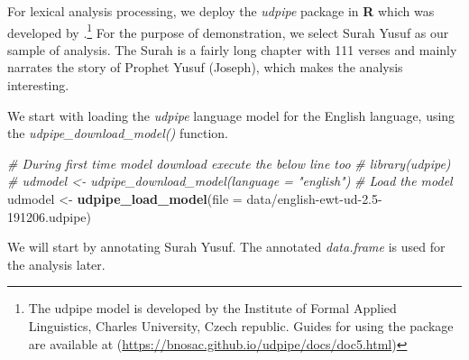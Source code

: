 \documentclass[
]{article}
\newenvironment{Shaded}{\begin{snugshade}}{\end{snugshade}}
\newcommand{\AttributeTok}[1]{\textcolor[rgb]{0.13,0.29,0.53}{#1}}
\newcommand{\CommentTok}[1]{\textcolor[rgb]{0.56,0.35,0.01}{\textit{#1}}}
\newcommand{\DecValTok}[1]{\textcolor[rgb]{0.00,0.00,0.81}{#1}}
\newcommand{\FunctionTok}[1]{\textcolor[rgb]{0.13,0.29,0.53}{\textbf{#1}}}
\newcommand{\NormalTok}[1]{#1}
\newcommand{\OtherTok}[1]{\textcolor[rgb]{0.56,0.35,0.01}{#1}}
\newcommand{\SpecialCharTok}[1]{\textcolor[rgb]{0.81,0.36,0.00}{\textbf{#1}}}
\newcommand{\StringTok}[1]{\textcolor[rgb]{0.31,0.60,0.02}{#1}}
\begin{document}
For lexical analysis processing, we deploy the \emph{udpipe} package in \textbf{R} which was developed by \citet{udpipe}.\footnote{The udpipe model is developed by the Institute of Formal Applied Linguistics, Charles University, Czech republic. Guides for using the package are available at (\url{https://bnosac.github.io/udpipe/docs/doc5.html})} For the purpose of demonstration, we select Surah Yusuf as our sample of analysis. The Surah is a fairly long chapter with 111 verses and mainly narrates the story of Prophet Yusuf (Joseph), which makes the analysis interesting.

We start with loading the \emph{udpipe} language model for the English language, using the \emph{udpipe\_download\_model()} function.

\footnotesize

\begin{Shaded}
\begin{Highlighting}[]
\CommentTok{\# During first time model download execute the below line too}
\CommentTok{\# library(udpipe)}
\CommentTok{\# udmodel \textless{}{-} udpipe\_download\_model(language = "english")}
\CommentTok{\# Load the model}
\NormalTok{udmodel }\OtherTok{\textless{}{-}} \FunctionTok{udpipe\_load\_model}\NormalTok{(}\AttributeTok{file =} \StringTok{\textquotesingle{}data/english{-}ewt{-}ud{-}2.5{-}191206.udpipe\textquotesingle{}}\NormalTok{)}
\end{Highlighting}
\end{Shaded}

\normalsize

We will start by annotating Surah Yusuf. The annotated \emph{data.frame} is used for the analysis later.

\footnotesize

\begin{Shaded}
\end{Shaded}
\end{document}
